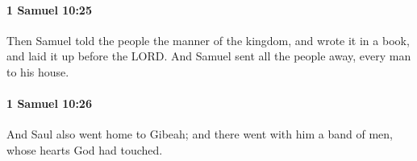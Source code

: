 		\paragraph{1 Samuel 10:25} %
			\label{1SAMUEL-10-25}

			Then Samuel told the people the manner of the kingdom, and wrote it in a book, and laid it up before the LORD. And Samuel sent all the people away, every man to his house.


		\paragraph{1 Samuel 10:26} %
			\label{1SAMUEL-10-26}

			And Saul also went home to Gibeah; and there went with him a band of men, whose hearts God had touched.


